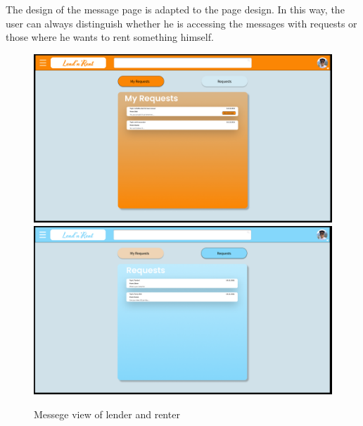 \noindent
The design of the message page is adapted to the page design. In this way, the user can always distinguish whether he is accessing the messages with requests or those where he wants to rent something himself.

\begin{figure}[H]
	\centering
	\includegraphics[width=0.49\linewidth]{abb/22chatrent}
	\includegraphics[width=0.49\linewidth]{abb/21chatlend}
	\caption{Messege view of lender and renter}
	\label{fig:messages}
	\centering
\end{figure}